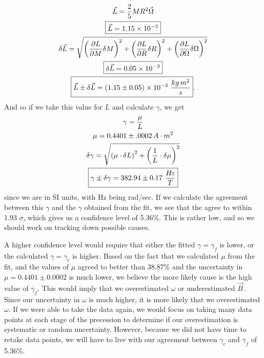 \documentclass{article}
\newcommand{\B}{$\vec{B}\,$}
\DeclarePairedDelimiter{\parens}{\lparen}{\rparen}
\begin{document}
	\begin{gather*}
		\vec{L} = \frac{2}{5}MR^2\vec{\Omega}\\
		\boxed{\vec{L} = 1.15\times10^{-3}}\\
		\delta \vec{L} = \sqrt{ \parens*{\frac{\partial L}{\partial M}\delta M}^2 + \parens*{\frac{\partial L}{\partial R}\delta R}^2 + \parens*{\frac{\partial L}{\partial \Omega} \delta \Omega}^2 }\\
		\boxed{\delta \vec{L} = 0.05\times10^{-3}}\\
		\boxed{\vec{L}\pm\delta\vec{L} = \parens*{1.15 \pm 0.05}\times10^{-3} \, \, \frac{kg \, m^2}{s}}.
	\end{gather*}
	And so if we take this value for $L$ and calculate $\gamma$, we get
	\begin{gather*}
		\gamma = \frac{\mu}{L}\\
		\mu = 0.4401 \pm .0002 \, A\cdot m^2\\
		\delta\gamma = \sqrt{ \parens*{\mu \cdot \delta L}^2 + \parens*{\frac{1}{L}\cdot\delta\mu}^2 }\\
		\boxed{\gamma \pm \delta\gamma = 382.94 \pm 0.17 \,\, \frac{H\!z}{T}}
	\end{gather*}
	since we are in SI units, with Hz being rad/sec.  If we calculate the agreement between this $\gamma$ and the $\gamma$ obtained from the fit, we see that the agree to within 1.93 $\sigma$, which gives us a confidence level of 5.36\%.  This is rather low, and so we should work on tracking down possible causes.  

	\vspace{.25cm}

	A higher confidence level would require that either the fitted $\gamma = \gamma_f$ is lower, or the calculated $\gamma = \gamma_c$ is higher.  Based on the fact that we calculated $\mu$ from the fit, and the values of $\mu$ agreed to better than 38.87\% and the uncertainty in $\mu = 0.4401 \pm 0.0002$ is much lower, we believe the more likely cause is the high value of $\gamma_f$.  This would imply that we overestimated $\omega$ or underestimated \B.  Since our uncertainty in $\omega$ is much higher, it is more likely that we overestimated $\omega$.  If we were able to take the data again, we would focus on taking many data points at each stage of the precession to determine if our overestimation is systematic or random uncertainty.  However, because we did not have time to retake data points, we will have to live with our agreement between $\gamma_c$ and $\gamma_f$ of 5.36\%.
\end{document}
